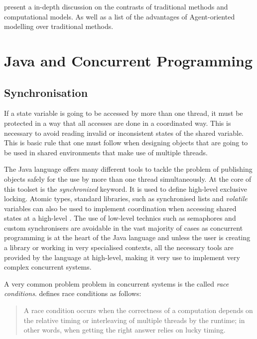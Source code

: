 \citeauthor{miller2007complex} present a in-depth discussion on the contrasts of traditional methods and computational models. As well as a list of the advantages of Agent-oriented modelling over traditional methods. 

\section{Java and Concurrent Programming}

\subsection{Synchronisation}

If a state variable is going to be accessed by more than one thread, it must be protected in a way that all accesses are done in a coordinated way. This is necessary to avoid reading invalid or inconsistent states of the shared variable. This is basic rule that one must follow when designing objects that are going to be used in shared environments that make use of multiple threads.

The Java language offers many different tools to tackle the problem of publishing objects safely for the use by more than one thread simultaneously. At the core of this toolset is the \emph{synchronized} keyword. It is used to define high-level exclusive locking. Atomic types, standard libraries, such as synchronised lists and \emph{volatile} variables can also be used to implement coordination when accessing shared states at a high-level . The use of low-level technics such as semaphores and custom synchronisers are
 avoidable in the vast majority of cases as concurrent programming is at the heart of the Java language and unless the user is creating a library or working in very specialised contexts, all the necessary tools are provided by the language at high-level, making it very use to implement very complex concurrent systems.

A very common problem problem in concurrent systems is the called \emph{race conditions}. \citeauthor{goetz2006java} defines race conditions as follows:

\begin{quote}
   A race condition occurs when the correctness of a computation depends on the relative timing or interleaving of multiple threads by the runtime; in other words, when getting the right answer relies on lucky timing.
\end{quote}

